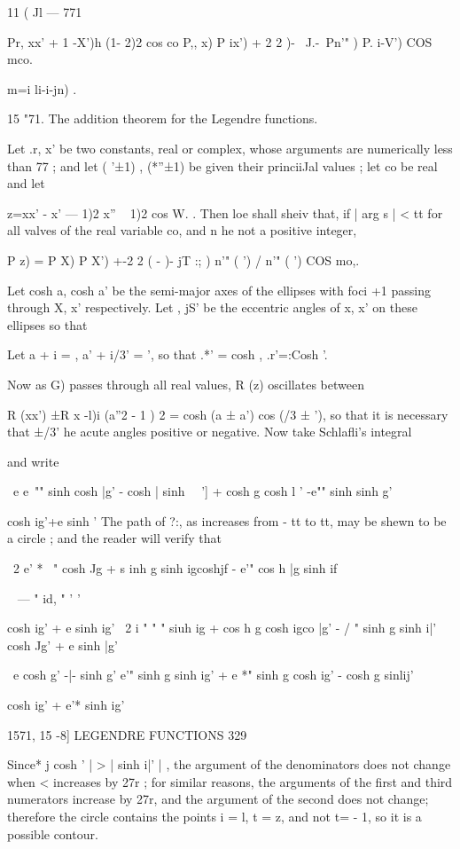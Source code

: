 {{{11   ( Jl — 771    

Pr, xx' +  1 -X')h (1- 2)2 cos co  P,, x) P  ix') + 2 2 )- ~J.-\ Pn'"   ) P. i-V') COS mco. 

m=i  li-i-jn) . 

15 "71. The addition theorem for the Legendre functions. 

Let .r, x' be two constants, real or complex, whose arguments are numerically less than 
 77 ; and let ( '±1) , (*''±1)  be given their princiiJal values ; let co be real and let 

z=xx' - x'  — 1)2  x'' ~ 1)2 cos W. . 
Then loe shall sheiv that, if | arg s | <  tt for all valves of the real variable co, and n he 
not a positive integer, 

P   z) = P   X) P   X') +-2 2  ( - )- jT :; )  n'" ( ') / n'" ( ') COS mo,. 

Let cosh a, cosh a' be the semi-major axes of the ellipses with foci +1 passing through 
X, x' respectively. Let  , jS' be the eccentric angles of x, x' on these ellipses so that 

Let a + i  =  , a' + i/3' =  ', so that .*' = cosh , .r'=:Cosh  '. 

Now as G) passes through all real values, R (z) oscillates between 

R (xx') ±R x -l)i (a''2 - 1 ) 2 = cosh (a ± a') cos (/3 ±  '), 
so that it is necessary that  ±/3' he acute angles positive or negative. 
Now take Schlafli's integral 

and write 

\ e   e~"" sinh   cosh |g' - cosh | sinh \ \  '] + cosh g cosh l  ' -e"" sinh   sinh  g' 

cosh ig'+e sinh  ' 
The path of ?:, as increases from - tt to tt, may be shewn to be a circle ; and the 
reader will verify that 

\  2  e'  * ~"  cosh Jg + s inh g   sinh igcoshjf - e'" cos h |g sinh if  

 ~ — "   id, " ' ' 

cosh ig' + e sinh ig' 
\  2  i  "  " "  siuh ig + cos h  g   cosh igco |g' - / " sinh  g sinh i|'  
cosh Jg' + e sinh |g' 



\   e  cosh  g' -|- sinh  g'   e'" sinh g sinh  ig' + e *" sinh g cosh  ig' - cosh g sinlij'  

cosh ig' + e'* sinh ig' 



1571, 15 -8] LEGENDRE FUNCTIONS 329 

Since* j cosh  ' | > | sinh i|' | , the argument of the denominators does not change when 
<  increases by 27r ; for similar reasons, the arguments of the first and third numerators 
increase by 27r, and the argument of the second does not change; therefore the circle 
contains the points i = l, t = z, and not t= - 1, so it is a possible contour. 

}}}
